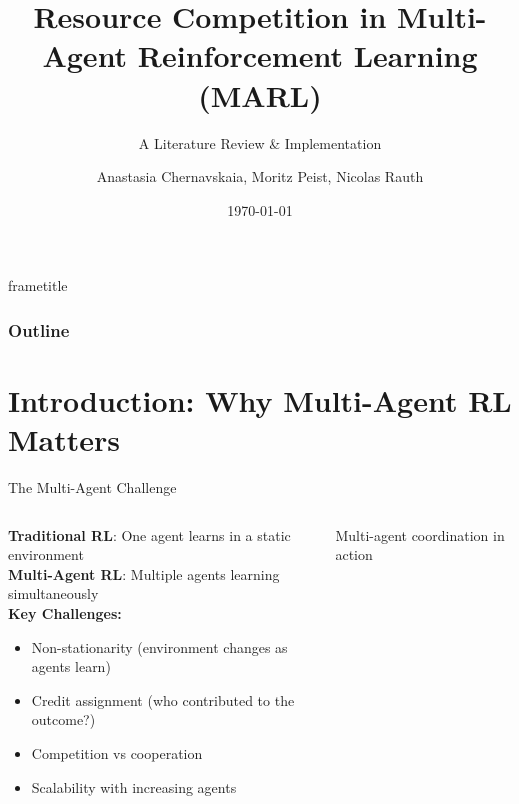 \documentclass[aspectratio=169]{beamer}
\title{Resource Competition in Multi-Agent Reinforcement Learning (MARL)}
\subtitle{A Literature Review \& Implementation}
\date{\today}
\author{Anastasia Chernavskaia, Moritz Peist, Nicolas Rauth}
\institute{}
\begin{document}
\begin{frame}{}
    \titlepage
\end{frame}

{
    \nointerlineskip
    \begin{beamercolorbox}[sep=0.3cm,wd=\paperwidth]{frametitle}
        \strut\insertframetitle\strut
        \hfill
        \raisebox{-0.8mm}{}
    \end{beamercolorbox}
}

\begin{frame}
    \frametitle{Outline}
    \tableofcontents
\end{frame}

\section{Introduction: Why Multi-Agent RL Matters}

\begin{frame}{The Multi-Agent Challenge}
    
    \begin{columns}
        \begin{column}{0.45\textwidth}
            \textbf{Traditional RL}: One agent learns in a static environment \\
            \textbf{Multi-Agent RL}: Multiple agents learning simultaneously \\
            \textbf{Key Challenges:}
            \begin{itemize}
                \item Non-stationarity (environment changes as agents learn)
                \item Credit assignment (who contributed to the outcome?)
                \item Competition vs cooperation
                \item Scalability with increasing agents
            \end{itemize}
        \end{column}
        \begin{column}{0.55\textwidth}
            \centering
            \small{Multi-agent coordination in action}
        \end{column}
    \end{columns}
\end{frame}
\end{document}
